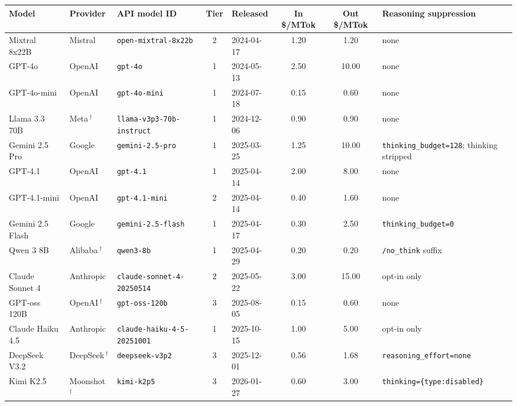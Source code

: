\begin{table}[!t]
\centering
\scriptsize
\setlength{\tabcolsep}{3pt}
\begin{tabular}{lllclccp{3.5cm}}
\toprule
\textbf{Model} & \textbf{Provider} & \textbf{API model ID} & \textbf{Tier} & \textbf{Released} & \textbf{In \$/MTok} & \textbf{Out \$/MTok} & \textbf{Reasoning suppression} \\
\midrule
Mixtral 8x22B     & Mistral   & \texttt{open-mixtral-8x22b}             & 2 & 2024-04-17 & 1.20 &  1.20 & none \\
GPT-4o            & OpenAI    & \texttt{gpt-4o}                         & 1 & 2024-05-13 & 2.50 & 10.00 & none \\
GPT-4o-mini       & OpenAI    & \texttt{gpt-4o-mini}                    & 1 & 2024-07-18 & 0.15 &  0.60 & none \\
Llama 3.3 70B     & Meta\,$^{\dagger}$    & \texttt{llama-v3p3-70b-instruct}        & 1 & 2024-12-06 & 0.90 &  0.90 & none \\
Gemini 2.5 Pro    & Google    & \texttt{gemini-2.5-pro}                 & 1 & 2025-03-25 & 1.25 & 10.00 & \texttt{thinking\_budget=128}; thinking stripped \\
GPT-4.1           & OpenAI    & \texttt{gpt-4.1}                        & 1 & 2025-04-14 & 2.00 &  8.00 & none \\
GPT-4.1-mini      & OpenAI    & \texttt{gpt-4.1-mini}                   & 2 & 2025-04-14 & 0.40 &  1.60 & none \\
Gemini 2.5 Flash  & Google    & \texttt{gemini-2.5-flash}               & 1 & 2025-04-17 & 0.30 &  2.50 & \texttt{thinking\_budget=0} \\
Qwen 3 8B         & Alibaba\,$^{\dagger}$ & \texttt{qwen3-8b}                       & 1 & 2025-04-29 & 0.20 &  0.20 & \texttt{/no\_think} suffix \\
Claude Sonnet 4   & Anthropic & \texttt{claude-sonnet-4-20250514}       & 2 & 2025-05-22 & 3.00 & 15.00 & opt-in only \\
GPT-oss 120B      & OpenAI\,$^{\dagger}$  & \texttt{gpt-oss-120b}                   & 3 & 2025-08-05 & 0.15 &  0.60 & none \\
Claude Haiku 4.5  & Anthropic & \texttt{claude-haiku-4-5-20251001}      & 1 & 2025-10-15 & 1.00 &  5.00 & opt-in only \\
DeepSeek V3.2     & DeepSeek\,$^{\dagger}$  & \texttt{deepseek-v3p2}                  & 3 & 2025-12-01 & 0.56 &  1.68 & \texttt{reasoning\_effort=none} \\
Kimi K2.5         & Moonshot\,$^{\dagger}$  & \texttt{kimi-k2p5}                      & 3 & 2026-01-27 & 0.60 &  3.00 & \texttt{thinking=\{type:disabled\}} \\

\end{tabular}
\end{table}
